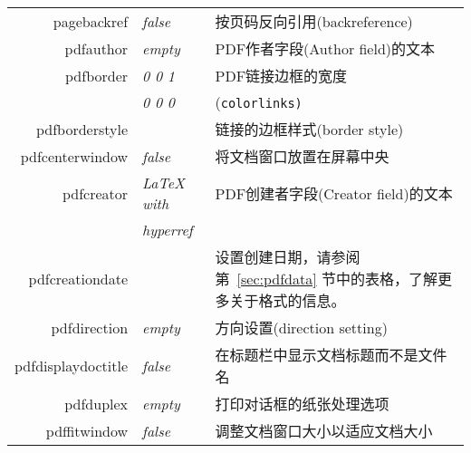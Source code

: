 \documentclass{article}
\begin{document}
\begin{longtable}{@{}>{\ttfamily}rlp{7cm}@{}}
  pagebackref                         & \textit{false}         & 按页码反向引用(backreference)                                                                          \\
  pdfauthor                           & \textit{empty}         & PDF作者字段(Author field)的文本                                                                        \\
  pdfborder                           & \textit{0 0 1}         & PDF链接边框的宽度                                                                                      \\
                                      & \textit{0 0 0}         & (\texttt{colorlinks)}                                                                           \\
  pdfborderstyle                      &                        & 链接的边框样式(border style)                                                                           \\
  pdfcenterwindow                     & \textit{false}         & 将文档窗口放置在屏幕中央                                                                                    \\
  pdfcreator                          & \textit{LaTeX with}    & PDF创建者字段(Creator field)的文本                                                                      \\
                                      & \textit{hyperref}      &                                                                                                 \\
  pdfcreationdate                     &                        & 设置创建日期，请参阅第~\ref{sec:pdfdata} 节中的表格，了解更多关于格式的信息。                                                \\
  pdfdirection                        & \textit{empty}         & 方向设置(direction setting)                                                                         \\
  pdfdisplaydoctitle                  & \textit{false}         & 在标题栏中显示文档标题而不是文件名                                                                               \\
  pdfduplex                           & \textit{empty}         & 打印对话框的纸张处理选项                                                                                    \\
  pdffitwindow                        & \textit{false}         & 调整文档窗口大小以适应文档大小                                                                                 \\

\end{longtable}
\end{document}
